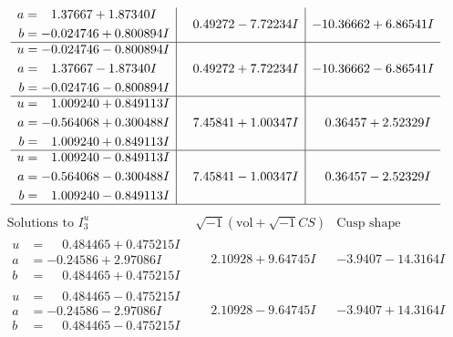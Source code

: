 \documentclass[1p]{elsarticle_modified}
\theoremstyle{definition}
\newcommand{\I}{\sqrt{-1}}
\begin{document}
$$\begin{array}{c|c|c}
\begin{aligned}
a &= \phantom{-}1.37667 + 1.87340 I \\
b &= -0.024746 + 0.800894 I\end{aligned}
 & \phantom{-}0.49272 - 7.72234 I & -10.36662 + 6.86541 I \\ \hline\begin{aligned}
u &= -0.024746 - 0.800894 I \\
a &= \phantom{-}1.37667 - 1.87340 I \\
b &= -0.024746 - 0.800894 I\end{aligned}
 & \phantom{-}0.49272 + 7.72234 I & -10.36662 - 6.86541 I \\ \hline\begin{aligned}
u &= \phantom{-}1.009240 + 0.849113 I \\
a &= -0.564068 + 0.300488 I \\
b &= \phantom{-}1.009240 + 0.849113 I\end{aligned}
 & \phantom{-}7.45841 + 1.00347 I & \phantom{-}0.36457 + 2.52329 I \\ \hline\begin{aligned}
u &= \phantom{-}1.009240 - 0.849113 I \\
a &= -0.564068 - 0.300488 I \\
b &= \phantom{-}1.009240 - 0.849113 I\end{aligned}
 & \phantom{-}7.45841 - 1.00347 I & \phantom{-}0.36457 - 2.52329 I\\
 \hline 
 \end{array}$$\newpage$$\begin{array}{c|c|c}  
\text{Solutions to }I^u_{3}& \I (\text{vol} + \sqrt{-1}CS) & \text{Cusp shape}\\
 \hline 
\begin{aligned}
u &= \phantom{-}0.484465 + 0.475215 I \\
a &= -0.24586 + 2.97086 I \\
b &= \phantom{-}0.484465 + 0.475215 I\end{aligned}
 & \phantom{-}2.10928 + 9.64745 I & -3.9407 - 14.3164 I \\ \hline\begin{aligned}
u &= \phantom{-}0.484465 - 0.475215 I \\
a &= -0.24586 - 2.97086 I \\
b &= \phantom{-}0.484465 - 0.475215 I\end{aligned}
 & \phantom{-}2.10928 - 9.64745 I & -3.9407 + 14.3164 I \\ \hline\begin{aligned}

\end{aligned}
\end{array}$$
\end{document}
